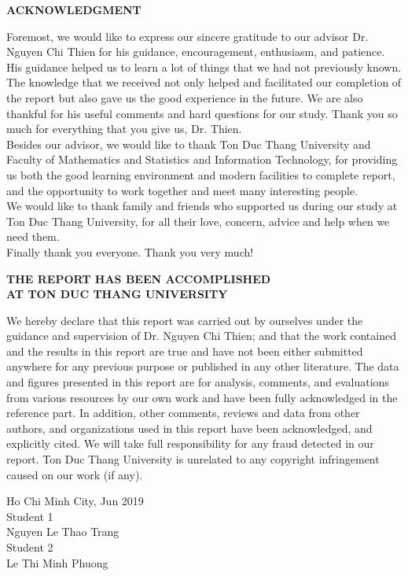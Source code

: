 	\newpage
	\thispagestyle{empty}
	\renewcommand{\baselinestretch}{1.2}
	\begin{center}
		\Large{\textbf{ACKNOWLEDGMENT}} \\
	\end{center}
	Foremost, we would like to express our sincere gratitude to our advisor Dr. Nguyen Chi Thien for his guidance, encouragement, enthusiasm, and patience. His guidance helped us to learn a lot of things that we had not previously known. The knowledge that we received not only helped and facilitated our completion of the report but also gave us the good experience in the future.  We are also thankful for his useful comments and hard questions for our study. Thank you so much for everything that you give us, Dr. Thien.
	\\
	Besides our advisor, we would like to thank Ton Duc Thang University and Faculty of Mathematics and Statistics and Information Technology, for providing us both the good learning environment and modern facilities to complete report, and the opportunity to work together and meet many interesting people.
	\\
	We would like to thank family and friends who supported us during our study at Ton Duc Thang University, for all their love, concern, advice and help when we need them. 
	\\
	Finally thank you everyone. Thank you very much!
	\newpage
	\thispagestyle{empty}
	\renewcommand{\baselinestretch}{1.2}
\begin{center}
	\Large{\textbf{THE REPORT HAS BEEN ACCOMPLISHED}} \\
	\Large{\textbf{AT TON DUC THANG UNIVERSITY}} \\
\end{center}

	We hereby declare that this report was carried out by ourselves under the guidance and supervision of Dr. Nguyen Chi Thien; and that the work contained and the results in this report are true and have not been either submitted anywhere for any previous purpose or published in any other literature. The data and figures presented in this report are for analysis, comments, and evaluations from various resources by our own work and have been fully acknowledged in the reference part.
	In addition, other comments, reviews and data from other authors, and organizations used in this report have been acknowledged, and explicitly cited.
	We will take full responsibility for any fraud detected in our report. Ton Duc Thang University is unrelated to any copyright infringement caused on our work (if any). \\
	
	\begin{flushright}
		Ho Chi Minh City, Jun 2019 \hspace*{1cm} \\
		Student 1 \hspace*{2.5cm} \\
		\vspace*{2cm}
		Nguyen Le Thao Trang \hspace*{1.2cm} \\
		Student 2 \hspace*{2.5cm} \\
		\vspace*{2cm}
		Le Thi Minh Phuong \hspace*{1.5cm}
	\end{flushright}